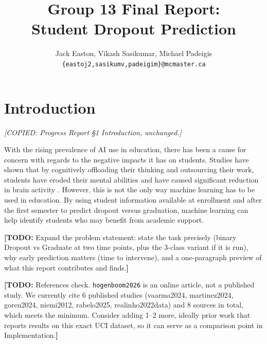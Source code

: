 \documentclass[11pt]{article}
\title{Group 13 Final Report:\\Student Dropout Prediction}
\author{Jack Easton, Vikash Sasikumar, Michael Padeigis \\
  \texttt{\{eastoj2,sasikumv,padeigim\}@mcmaster.ca} }
\newcommand{\todo}[1]{{\color{red}\textbf{[TODO:} #1\textbf{]}}}
\newcommand{\copynote}[1]{{\color{blue}\textit{[COPIED: #1]}}}
\newcommand{\todo}[1]{}
\newcommand{\copynote}[1]{}
\begin{document}
\maketitle


\section{Introduction}
\copynote{Progress Report \S1 Introduction, unchanged.}

With the rising prevalence of AI use in education, there has been a cause for concern with regards to the negative impacts it has on students. Studies have shown that by cognitively offloading their thinking and outsourcing their work, students have eroded their mental abilities and have caused significant reduction in brain activity \citep{hogenboom2026}. However, this is not the only way machine learning has to be used in education. By using student information available at enrollment and after the first semester to predict dropout versus graduation, machine learning can help identify students who may benefit from academic support.

\todo{Expand the problem statement: state the task precisely (binary Dropout vs Graduate at two time points, plus the 3-class variant if it is run), why early prediction matters (time to intervene), and a one-paragraph preview of what this report contributes and finds.}

\todo{References check. \texttt{hogenboom2026} is an online article, not a published study. We currently cite 6 published studies (vaarma2024, martinez2024, goren2024, niemi2012, rabelo2025, realinho2022data) and 8 sources in total, which meets the minimum. Consider adding 1--2 more, ideally prior work that reports results on this exact UCI dataset, so it can serve as a comparison point in Implementation.}
\end{document}
